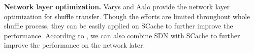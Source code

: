 {%
}


\textbf{Network layer optimization.} 
Varys \cite{varys} and Aalo \cite{aalo} provide the network layer optimization for shuffle transfer. 
Though the efforts are limited throughout whole shuffle process, they can be easily applied on SCache to further improve the performance.
According to \cite{qin2017bandwidth, huang2018survey}, we can also combine SDN with SCache to further improve the performance on the network later.
